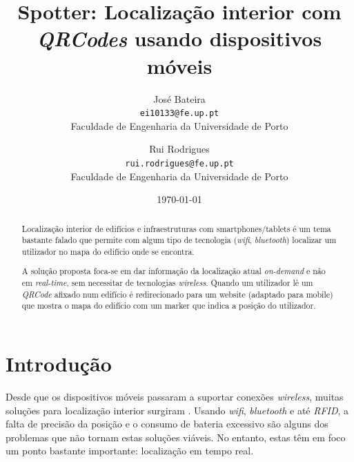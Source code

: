 \documentclass[twocolumn,twoside,11pt]{article}
\title{\vspace{-15mm}\fontsize{24pt}{10pt}\selectfont\textbf{
  Spotter: Localização interior com \emph{QRCodes} usando dispositivos móveis
}}
\author{José Bateira\\
\small \texttt{ei10133@fe.up.pt}\\
\small Faculdade de Engenharia da Universidade de Porto
\and
Rui Rodrigues\\
\small \texttt{rui.rodrigues@fe.up.pt} \\
\small Faculdade de Engenharia da Universidade de Porto
}
\date{\today}
\newcommand{\qrcode}{\emph{QRCode}}
\begin{document}
\maketitle
\thispagestyle{plain}            %


\begin{abstract}
Localização interior de edifícios e infraestruturas com smartphones/tablets é um tema bastante falado que permite com algum tipo de tecnologia (\emph{wifi}, \emph{bluetooth}) localizar um utilizador no mapa do edifício onde se encontra.

A solução proposta foca-se em dar informação da localização atual \emph{on-demand} e não em \emph{real-time}, sem necessitar de tecnologias \emph{wireless}.
Quando um utilizador lê um \qrcode{} afixado num edifício é redirecionado para um website (adaptado para mobile) que mostra o mapa do edifício com um marker que indica a posição do utilizador.

\end{abstract}


\section{Introdução}\label{sec:intro}

  Desde que os dispositivos móveis passaram a suportar conexões \emph{wireless}, muitas soluções para localização interior surgiram \cite{Liu2007} \cite{Koyuncu2010}.
  Usando \emph{wifi}, \emph{bluetooth} e até \emph{RFID}, a falta de precisão da posição e o consumo de bateria excessivo são alguns dos problemas que não tornam estas soluções viáveis.
  No entanto, estas têm em foco um ponto bastante importante: localização em tempo real.
\end{document}
